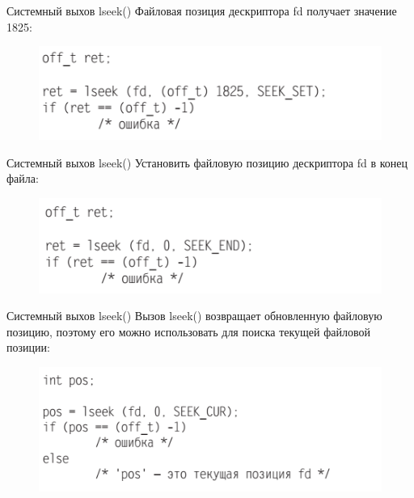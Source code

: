 \documentclass{beamer}
\begin{document}
\begin{frame}{Системный выхов lseek()}
Файловая позиция дескриптора fd получает значение 1825:
\begin{figure}[h]
\centering
\includegraphics[scale=0.6]{images/lec06-pic20.png}
\end{figure}
\end{frame}

\begin{frame}{Системный выхов lseek()}
Установить файловую позицию дескриптора fd в конец файла:
\begin{figure}[h]
\centering
\includegraphics[scale=0.6]{images/lec06-pic21.png}
\end{figure}
\end{frame}

\begin{frame}{Системный выхов lseek()}
Вызов lseek() возвращает обновленную файловую позицию, поэтому его можно использовать для поиска текущей файловой позиции:
\begin{figure}[h]
\centering
\includegraphics[scale=0.6]{images/lec06-pic22.png}
\end{figure}
\end{frame}

\end{document}
